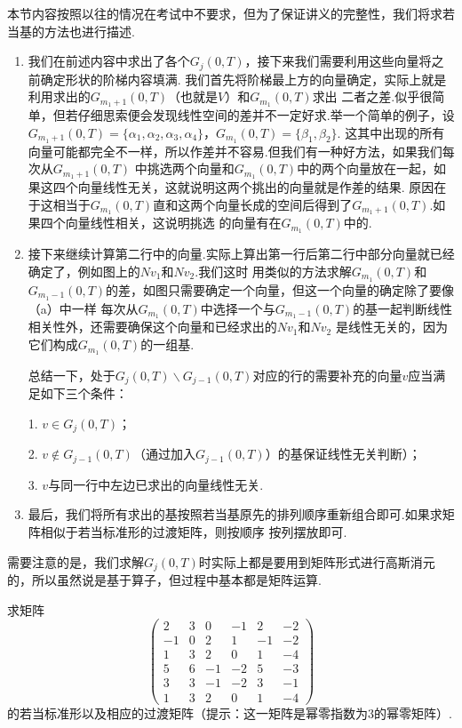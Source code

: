\begin{enumerate}
	本节内容按照以往的情况在考试中不要求，但为了保证讲义的完整性，我们将求若当基的方法也进行描述.
	\begin{enumerate}
		\item 我们在前述内容中求出了各个$G_j(0,T)$，接下来我们需要利用这些向量将之前确定形状的阶梯内容填满.
		我们首先将阶梯最上方的向量确定，实际上就是利用求出的$G_{m_1+1}(0,T)$（也就是$V$）和$G_{m_1}(0,T)$求出
		二者之差.似乎很简单，但若仔细思索便会发现线性空间的差并不一定好求.举一个简单的例子，设
		$G_{m_1+1}(0,T)=\{\alpha_1,\alpha_2,\alpha_3,\alpha_4\}$，$G_{m_1}(0,T)=\{\beta_1,\beta_2\}$.
		这其中出现的所有向量可能都完全不一样，所以作差并不容易.但我们有一种好方法，如果我们每次从$G_{m_1+1}(0,T)$
		中挑选两个向量和$G_{m_1}(0,T)$中的两个向量放在一起，如果这四个向量线性无关，这就说明这两个挑出的向量就是作差的结果.
		原因在于这相当于$G_{m_1}(0,T)$直和这两个向量长成的空间后得到了$G_{m_1+1}(0,T)$.如果四个向量线性相关，这说明挑选
		的向量有在$G_{m_1}(0,T)$中的.
		\item 接下来继续计算第二行中的向量.实际上算出第一行后第二行中部分向量就已经确定了，例如图上的$Nv_1$和$Nv_2$.我们这时
		用类似的方法求解$G_{m_1}(0,T)$和$G_{m_1-1}(0,T)$的差，如图只需要确定一个向量，但这一个向量的确定除了要像（a）中一样
		每次从$G_{m_1}(0,T)$中选择一个与$G_{m_1-1}(0,T)$的基一起判断线性相关性外，还需要确保这个向量和已经求出的$Nv_1$和$Nv_2$
		是线性无关的，因为它们构成$G_{m_1}(0,T)$的一组基.

		总结一下，处于$G_j(0,T)\backslash G_{j-1}(0,T)$对应的行的需要补充的向量$v$应当满足如下三个条件：

		1. $v\in G_j(0,T)$；

		2. $v\notin G_{j-1}(0,T)$（通过加入$G_{j-1}(0,T)$）的基保证线性无关判断）；

		3. $v$与同一行中左边已求出的向量线性无关.
		\item 最后，我们将所有求出的基按照若当基原先的排列顺序重新组合即可.如果求矩阵相似于若当标准形的过渡矩阵，则按顺序
		按列摆放即可.
	\end{enumerate}
\end{enumerate}
需要注意的是，我们求解$G_j(0,T)$时实际上都是要用到矩阵形式进行高斯消元的，所以虽然说是基于算子，但过程中基本都是矩阵运算.
\begin{example}
	求矩阵$$\begin{pmatrix}
		2 & 3 & 0 & -1 & 2 & -2 \\ -1 & 0 & 2 & 1 & -1 & -2 \\
		1 & 3 & 2 & 0  & 1 & -4 \\ 5 & 6 & -1 & -2 & 5 & -3 \\
		3 & 3 & -1 & -2 & 3 & -1 \\ 1 & 3 & 2 & 0 & 1 & -4
	\end{pmatrix}$$的若当标准形以及相应的过渡矩阵（提示：这一矩阵是幂零指数为$3$的幂零矩阵）.
\end{example}
